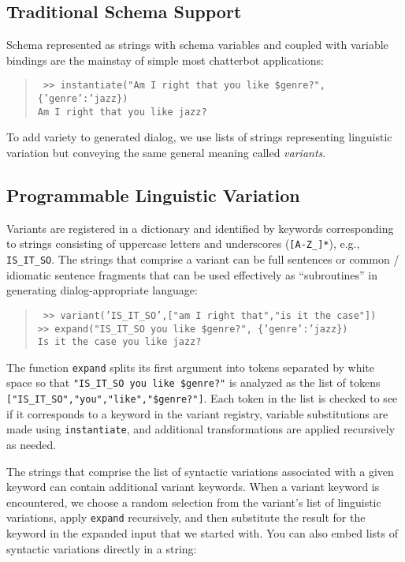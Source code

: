 \documentclass[letterpaper,12pt]{article}
\begin{document}
\subsection*{Traditional Schema Support}

Schema represented as strings with schema variables and coupled with variable bindings are the mainstay of simple most chatterbot applications:

\begin{quotation} \tt
%
  >> instantiate("Am I right that you like \$genre?", \{'genre':'jazz\})\\
  Am I right that you like jazz?\\
%
\end{quotation}

To add variety to generated dialog, we use lists of strings representing linguistic variation but conveying the same general meaning called {\it{variants}}.

\subsection*{Programmable Linguistic Variation}

Variants are registered in a dictionary and identified by keywords corresponding to strings consisting of uppercase letters and underscores ({\tt{[A-Z_]*}}), e.g., {\tt{IS_IT_SO}}.
%
The strings that comprise a variant can be full sentences or common / idiomatic sentence fragments that can be used effectively as ``subroutines'' in generating dialog-appropriate language:

\begin{quotation} \tt
%
  >> variant('IS_IT_SO',["am I right that","is it the case"])\\
  >> expand("IS_IT_SO you like \$genre?", \{'genre':'jazz\})\\
  Is it the case you like jazz?\\
%
\end{quotation}

The function {\tt{expand}} splits its first argument into tokens separated by white space so that {\tt{"IS_IT_SO you like \$genre?"}} is analyzed as the list of tokens {\tt{["IS_IT_SO","you","like","\$genre?"]}}. Each token in the list is checked to see if it corresponds to a keyword in the variant registry, variable substitutions are made using {\tt{instantiate}}, and additional transformations are applied recursively as needed.

The strings that comprise the list of syntactic variations associated with a given keyword can contain additional variant keywords. When a variant keyword is encountered, we choose a random selection from the variant's list of linguistic variations, apply {\tt{expand}} recursively, and then substitute the result for the keyword in the expanded input that we started with.  You can also embed lists of syntactic variations directly in a string:
\end{document}
